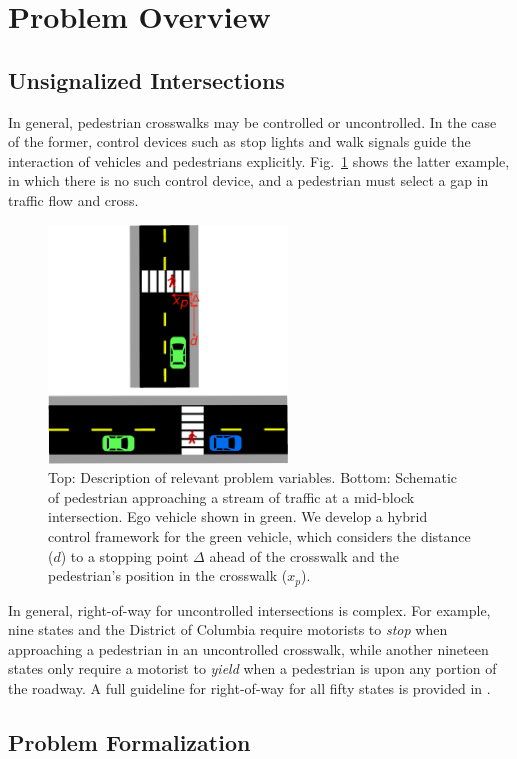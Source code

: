 \documentclass[letterpaper, 10 pt, conference]{ieeeconf} %
\begin{document}
\section{Problem Overview}

\subsection{Unsignalized Intersections}

In general, pedestrian crosswalks may be controlled or uncontrolled. In the case of the former, control devices such as stop lights and walk signals guide the interaction of vehicles and pedestrians explicitly. Fig.~\ref{fig:schematic} shows the latter example, in which there is no such control device, and a pedestrian must select a gap in traffic flow and cross.  

\begin{figure}
\centering
\includegraphics[width=2.5in]{figures/example2.eps}
\caption{Top: Description of relevant problem variables. Bottom: Schematic of pedestrian approaching a stream of traffic at a mid-block intersection. Ego vehicle shown in green. We develop a hybrid control framework for the green vehicle, which considers the distance ($d$) to a stopping point $\Delta$ ahead of the crosswalk and the pedestrian's position in the crosswalk ($x_p$).}
\label{fig:schematic}
\end{figure}

In general, right-of-way for uncontrolled intersections is complex. For example, nine states and the District of Columbia require motorists to \textit{stop} when approaching a pedestrian in an uncontrolled crosswalk, while another nineteen states only require a motorist to \textit{yield} when a pedestrian is upon any portion of the roadway. A full guideline for right-of-way for all fifty states is provided in \cite{Legislatures2018}.

\subsection{Problem Formalization}
\label{sec:probform}
\end{document}

